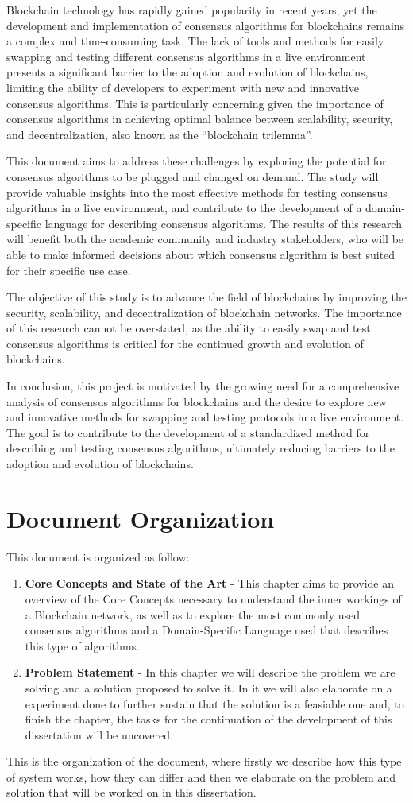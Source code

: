 Blockchain technology has rapidly gained popularity in recent years, yet the development and implementation of consensus algorithms for blockchains remains a complex and time-consuming task. The lack of tools and methods for easily swapping and testing different consensus algorithms in a live environment presents a significant barrier to the adoption and evolution of blockchains, limiting the ability of developers to experiment with new and innovative consensus algorithms. This is particularly concerning given the importance of consensus algorithms in achieving optimal balance between scalability, security, and decentralization, also known as the ``blockchain trilemma''.

This document aims to address these challenges by exploring the potential for consensus algorithms to be plugged and changed on demand. The study will provide valuable insights into the most effective methods for testing consensus algorithms in a live environment, and contribute to the development of a domain-specific language for describing consensus algorithms. The results of this research will benefit both the academic community and industry stakeholders, who will be able to make informed decisions about which consensus algorithm is best suited for their specific use case.

The objective of this study is to advance the field of blockchains by improving the security, scalability, and decentralization of blockchain networks. The importance of this research cannot be overstated, as the ability to easily swap and test consensus algorithms is critical for the continued growth and evolution of blockchains.

In conclusion, this project is motivated by the growing need for a comprehensive analysis of consensus algorithms for blockchains and the desire to explore new and innovative methods for swapping and testing protocols in a live environment. The goal is to contribute to the development of a standardized method for describing and testing consensus algorithms, ultimately reducing barriers to the adoption and evolution of blockchains.

\section{Document Organization}

This document is organized as follow:
\begin{enumerate}
    \item \textbf{Core Concepts and State of the Art} - This chapter aims to provide an overview of the Core Concepts necessary to understand the inner workings of a Blockchain network, as well as to explore the most commonly used consensus algorithms and a Domain-Specific Language used that describes this type of algorithms.
    \item \textbf{Problem Statement} - In this chapter we will describe the problem we are solving and a solution proposed to solve it. In it we will also elaborate on a experiment done to further sustain that the solution is a feasiable one and, to finish the chapter, the tasks for the continuation of the development of this dissertation will be uncovered.
\end{enumerate}

This is the organization of the document, where firstly we describe how this type of system works, how they can differ and then we elaborate on the problem and solution that will be worked on in this dissertation.
